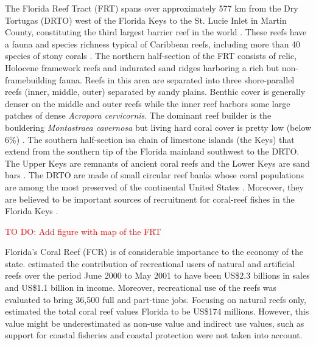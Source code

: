 \documentclass[12pt ,a4paper]{article}
\newcommand{\todo}[1]{\textcolor{red}{TO DO: #1}}
\begin{document}
The Florida Reef Tract (FRT) spans over approximately 577 km from the Dry Tortugas (DRTO) west of the Florida Keys to the St. Lucie Inlet in Martin County, constituting the third largest barrier reef in the world \citep{finkl2008shelf}. These reefs have a fauna and species richness typical of Caribbean reefs, including more than 40 species of stony corals \citep{banks2008reef,jackson2014status}. The northern half-section of the FRT consists of relic, Holocene framework reefs and indurated sand ridges harboring a rich but non-framebuilding fauna. Reefs in this area are separated into three shore-parallel reefs (inner, middle, outer) separated by sandy plains. Benthic cover is generally denser on the middle and outer reefs while the inner reef harbors some large patches of dense \textit{Acropora cervicornis}. The dominant reef builder is the bouldering \textit{Montastraea cavernosa} but living hard coral cover is pretty low (below 6\%) \citep{banks2008reef}. The southern half-section isa chain of limestone islands (the Keys) that extend from the southern tip of the Florida mainland southwest to the DRTO. The Upper Keys are remnants of ancient coral reefs and the Lower Keys are sand bars \citep{hoffmeister1968geology}. The DRTO are made of small circular reef banks whose coral populations are among the most preserved of the continental United States \citep{hine2008coral, kourafalou2018physical}. Moreover, they are believed to be important sources of recruitment for coral-reef fishes in the Florida Keys \citep{domeier2004potential}. 

\todo{Add figure with map of the FRT}

Florida's Coral Reef (FCR) is of considerable importance to the economy of the state. \cite{johns2003socio} estimated the contribution of recreational users of natural and artificial reefs over the period June 2000 to May 2001 to have been US\$2.3 billions in sales and US\$1.1 billion in income. Moreover, recreational use of the reefs was evaluated to bring 36,500 full and part-time jobs. Focusing on natural reefs only, \cite{brander2013total} estimated the total coral reef values Florida to be US\$174 millions. However, this value might be underestimated as non-use value and indirect use values, such as support for coastal fisheries \citep{ault2006building} and coastal protection \citep{ferrario2014effectiveness} were not taken into account.
\end{document}
